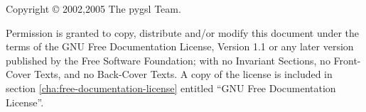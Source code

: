 Copyright \copyright{} 2002,2005 The pygsl Team.

Permission is granted to copy, distribute and/or modify this document under the
terms of the GNU Free Documentation License, Version 1.1 or any later version
published by the Free Software Foundation; with no Invariant Sections, no
Front-Cover Texts, and no Back-Cover Texts.  A copy of the license is included
in section \ref{cha:free-documentation-license} entitled ``GNU Free
Documentation License''.


